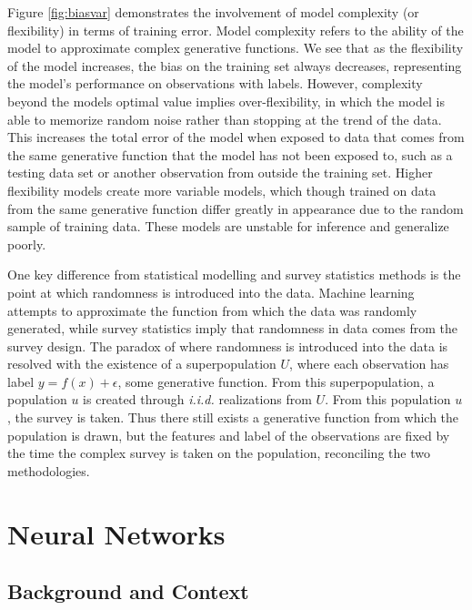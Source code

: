 \documentclass[12pt,twoside]{reedthesis}
\begin{document}
Figure \ref{fig:biasvar} demonstrates the involvement of model
complexity (or flexibility) in terms of training error. Model complexity
refers to the ability of the model to approximate complex generative
functions. We see that as the flexibility of the model increases, the
bias on the training set always decreases, representing the model's
performance on observations with labels. However, complexity beyond the
models optimal value implies over-flexibility, in which the model is
able to memorize random noise rather than stopping at the trend of the
data. This increases the total error of the model when exposed to data
that comes from the same generative function that the model has not been
exposed to, such as a testing data set or another observation from
outside the training set. Higher flexibility models create more variable
models, which though trained on data from the same generative function
differ greatly in appearance due to the random sample of training data.
These models are unstable for inference and generalize poorly.

One key difference from statistical modelling and survey statistics
methods is the point at which randomness is introduced into the data.
Machine learning attempts to approximate the function from which the
data was randomly generated, while survey statistics imply that
randomness in data comes from the survey design. The paradox of where
randomness is introduced into the data is resolved with the existence of
a superpopulation \(U\), where each observation has label
\(y = f(x) + \epsilon\), some generative function. From this
superpopulation, a population \(u\) is created through \emph{i.i.d.}
realizations from \(U\). From this population \(u\), the survey is
taken. Thus there still exists a generative function from which the
population is drawn, but the features and label of the observations are
fixed by the time the complex survey is taken on the population,
reconciling the two methodologies.

\section{Neural Networks}\label{neural-networks}

\subsection{Background and Context}\label{background-and-context}
\end{document}
